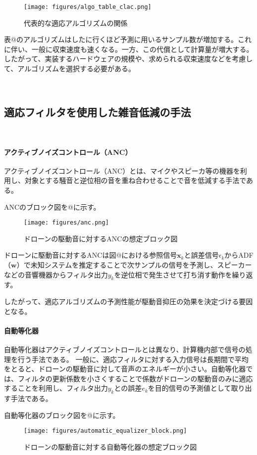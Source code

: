 \begin{figure}
\centering
\texttt{[image: figures/algo\_table\_clac.png]}
\caption{代表的な適応アルゴリズムの関係}
\label{algo_table_calc}
\end{figure}

表@のアルゴリズムはしたに行くほど予測に用いるサンプル数が増加する。これに伴い、一般に収束速度も速くなる。一方、この代償として計算量が増大する。したがって、実装するハードウェアの規模や、求められる収束速度などを考慮して、アルゴリズムを選択する必要がある。

\
\subsection{適応フィルタを使用した雑音低減の手法}\label{adf-noise-reduction}

\
\paragraph{アクティブノイズコントロール（ANC）}\label{anc}

アクティブノイズコントロール（ANC）とは、マイクやスピーカ等の機器を利用し、対象とする騒音と逆位相の音を重ね合わせることで音を低減する手法である。

ANCのブロック図を@に示す。

\begin{figure}
\centering
\texttt{[image: figures/anc.png]}
\caption{ドローンの駆動音に対するANCの想定ブロック図}
\label{anc_block}
\end{figure}

ドローンに駆動音に対するANCは図@における参照信号\(\bm{x}_k\)と誤差信号\(\epsilon_k\)からADF（\(\bm{w}\)）で未知システムを推定することで次サンプルの信号を予測し、スピーカーなどの音響機器からフィルタ出力\(y_k\)を逆位相で発生させて打ち消す動作を繰り返す。

したがって、適応アルゴリズムの予測性能が駆動音抑圧の効果を決定づける要因となる。

\paragraph{自動等化器}\label{automatic-equalizer}

自動等化器はアクティブノイズコントロールとは異なり、計算機内部で信号の処理を行う手法である。
一般に、適応フィルタに対する入力信号は長期間で平均をとると、ドローンの駆動音に対して音声のエネルギーが小さい。自動等化器では、フィルタの更新係数を小さくすることで係数がドローンの駆動音のみに適応することを利用し、フィルタ出力\(y_k\)との誤差\(e_k\)を目的信号の予測値として取り出す手法である。

自動等化器のブロック図を@に示す。

\begin{figure}
\centering
\texttt{[image: figures/automatic\_equalizer\_block.png]}
\caption{ドローンの駆動音に対する自動等化器の想定ブロック図}
\end{figure}
